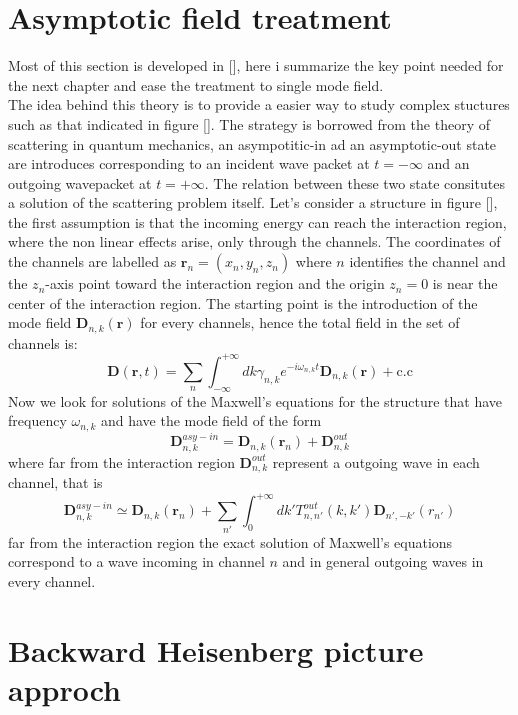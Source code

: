 \documentclass[12pt]{book}
\renewcommand{\r}{\mathbf{r}}
\begin{document}
\section{Asymptotic field treatment}
Most of this section is developed in [], here i summarize the key point needed for the next chapter and ease the treatment to single mode field.\\ The idea behind this theory is to provide a easier way to study complex stuctures such as that indicated in figure []. The strategy is borrowed from the theory of scattering in quantum mechanics, an asympotitic-in ad an asymptotic-out state are introduces corresponding to an incident wave packet at $t = -\infty$ and an outgoing wavepacket at $t = +\infty$. The relation between these two state consitutes a solution of the scattering problem itself. Let's consider a structure in figure [], the first assumption is that the incoming energy can reach the interaction region, where the non linear effects arise, only through the channels. The coordinates of the channels are labelled as $\r_n = (x_n,y_n,z_n)$ where $n$ identifies the channel and the $z_n$-axis point toward the interaction region and the origin $z_n = 0$ is near the center of the interaction region. The starting point is the introduction of the mode field $\mathbf{D}_{n,k}(\r)$ for every channels, hence the total field in the set of channels is:
\[\mathbf{D}(\r,t) = \sum_n\int_{-\infty}^{+\infty}dk \gamma_{n,k} e^{-i\omega_{n,k}t}\mathbf{D}_{n,k}(\r)  + \text{c.c}\]
Now we look for solutions of the Maxwell's equations for the structure that have frequency $\omega_{n,k}$ and have the mode field of the form
\[\mathbf{D}^{asy-in}_{n,k} =\mathbf{D}_{n,k}(\r_n) + \mathbf{D}^{out}_{n,k}\]
where far from the interaction region $\mathbf{D}^{out}_{n,k}$ represent a outgoing wave in each channel, that is
\[\mathbf{D}^{asy-in}_{n,k} \simeq \mathbf{D}_{n,k}(\r_n) + \sum_{n'}\int_{0}^{+\infty}dk' T^{out}_{n,n'}(k,k')\mathbf{D}_{n',-k'}(r_{n'})\]
far from the interaction region the exact solution of Maxwell's equations correspond to a wave incoming in channel $n$ and in general outgoing waves in every channel.




\section{Backward Heisenberg picture approch}
\end{document}

